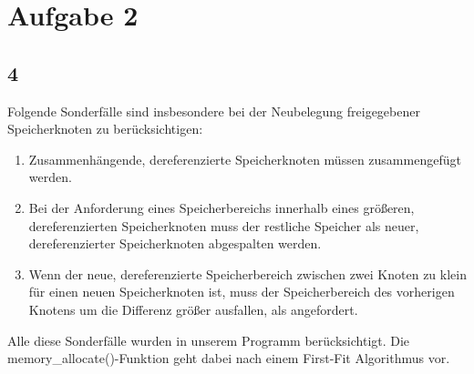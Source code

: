 \documentclass[numbers=noendperiod]{scrartcl}
\begin{document}
\section{Aufgabe 2}
\subsection*{4}
Folgende Sonderfälle sind insbesondere bei der Neubelegung freigegebener Speicherknoten zu berücksichtigen:
\begin{enumerate}
	\item Zusammenhängende, dereferenzierte Speicherknoten müssen zusammengefügt werden.
	\item Bei der Anforderung eines Speicherbereichs innerhalb eines größeren, dereferenzierten Speicherknoten muss der restliche Speicher als neuer, dereferenzierter Speicherknoten abgespalten werden.
	\item Wenn der neue, dereferenzierte Speicherbereich zwischen zwei Knoten zu klein für einen neuen Speicherknoten ist, muss der Speicherbereich des vorherigen Knotens um die Differenz größer ausfallen, als angefordert.
\end{enumerate}
Alle diese Sonderfälle wurden in unserem Programm berücksichtigt. Die memory\_allocate()-Funktion geht dabei nach einem First-Fit Algorithmus vor.
	
\end{document}
